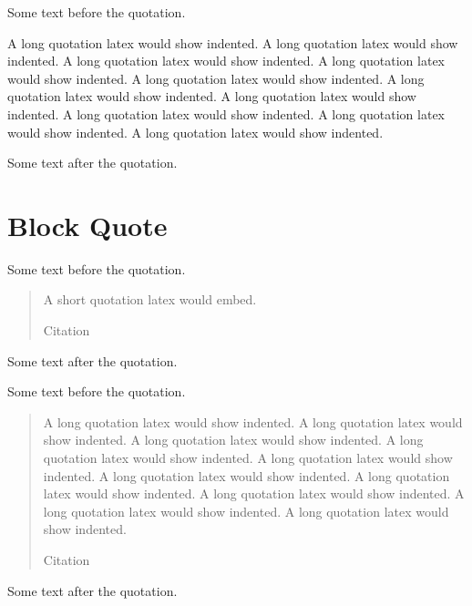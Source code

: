 \documentclass[a4paper]{article}
\begin{document}
Some text before the quotation. 
\begin{displayquote}[Citation]
A long quotation latex would show indented. 
A long quotation latex would show indented. 
A long quotation latex would show indented. 
A long quotation latex would show indented. 
A long quotation latex would show indented. 
A long quotation latex would show indented. 
A long quotation latex would show indented. 
A long quotation latex would show indented. 
A long quotation latex would show indented. 
A long quotation latex would show indented. 
\end{displayquote}
Some text after the quotation. 

\section{Block Quote}

Some text before the quotation. 
\blockquote[Citation]{A short quotation latex would embed. } 
Some text after the quotation. 

Some text before the quotation. 
\blockquote[Citation]{A long quotation latex would show indented. 
A long quotation latex would show indented. 
A long quotation latex would show indented. 
A long quotation latex would show indented. 
A long quotation latex would show indented. 
A long quotation latex would show indented. 
A long quotation latex would show indented. 
A long quotation latex would show indented. 
A long quotation latex would show indented. 
A long quotation latex would show indented. }
Some text after the quotation. 
\end{document}
